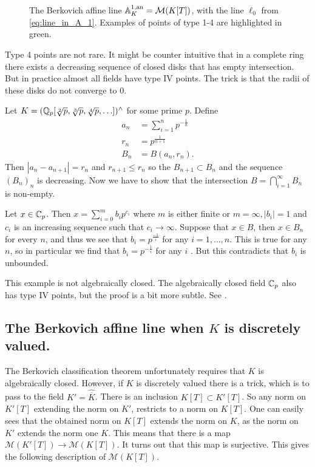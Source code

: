 \begin{figure}[h]
    \centering
	\caption{The Berkovich affine line $\mathbb{A}_K^{1, \text{an}} = \mathcal{M} (K[T])$, with the line $\ell_0$ from \cref{eq:line_in_A_1}. 
	Examples of points of type 1-4 are highlighted in green.}
	\label{fig:affine_line}
\end{figure}
Type 4 points are not rare. It might be counter intuitive that in a complete ring there exists a decreasing sequence of closed disks that has empty intersection. 
But in practice almost all fields have type  IV points. 
The trick is that the radii of these disks do not converge to $0$. 
\begin{example}\label{ex:type4point}
	Let $K = (\mathbb{Q}_p[\sqrt[2]{p} ,\sqrt[3]{p}, \sqrt[4]{p},\ldots])^{\wedge}  $ for some prime $p$. 
	Define 
	\begin{align*}
		a_n &= \sum_{i = 1}^{n} p^{-\frac{1}{n}}\\
		r_n &= p^{\frac{1}{n + 1}} \\
		B_n &= B(a_n, r_n) 
.\end{align*}
Then $|a_n - a_{n + 1}| = r_n$ and $r_{n + 1} \le r_n$ so the $B_{n + 1} \subset B_n$ and the sequence $(B_n)_n$ is decreasing. 
Now we have to show that the intersection $B = \bigcap_{i = 1} ^{\infty} B_n$ is non-empty. 

Let $x \in \mathbb{C}_p$. Then $x = \sum_{i = 0}^{m} b_i p^{c_i}$ where $m$ is either finite or $m = \infty, |b_i| = 1$ and $c_i$ is an increasing sequence such that $c_i \to \infty $. Suppose that  $x \in B$, then $x \in B_n$ for every $n$, and thus we see that  $b_i = p^{\frac{-1}{i}}$ for any $i = 1, \ldots, n$.  
This is true for any $n $, so in particular we find that $b_i = p^{-\frac{1}{i}}$ for any $i$ .
But this contradicts that $b_i$ is unbounded. 

This example is not algebraically closed.  
The algebraically closed field $\mathbb{C}_p$ also has type IV points, but the proof is a bit more subtle. See \cite[][sec. 3.4]{robertCoursePadicAnalysis2000}.
\end{example}

\subsection{The Berkovich affine line when $K$ is discretely valued.} \label{sec:the_berkovich_affine_line_when_k_is_discretely_valued.}
The Berkovich classification theorem unfortunately requires that $K$ is algebraically closed. 
However, if $K$ is discretely valued there is a trick, which is to pass to the field $K' = \hat{\overline{K}}$. 
There is an inclusion $K[T] \subset  K'[T]$. 
So any norm on $K'[T]$ extending the norm on $K'$, restricts to a norm on $K[T]$. 
One can easily sees that the obtained norm on $K[T]$ extends the norm on  $K$, as the norm on $K'$ extends the norm one $K$. 
This means that there is a map $\mathcal{M} \left(K'[T]\right) \to \mathcal{M} (K[T])$. 
It turns out that this map is surjective. 
This gives the following description of $\mathcal{M} (K[T])$.

